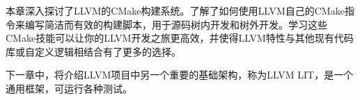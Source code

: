 本章深入探讨了LLVM的CMake构建系统。了解了如何使用LLVM自己的CMake指令来编写简洁而有效的构建脚本，用于源码树内开发和树外开发。学习这些CMake技能可以让你的LLVM开发之旅更高效，并使得LLVM特性与其他现有代码库或自定义逻辑相结合有了更多的选择。

下一章中，将介绍LLVM项目中另一个重要的基础架构，称为LLVM LIT，是一个通用框架，可运行各种测试。
